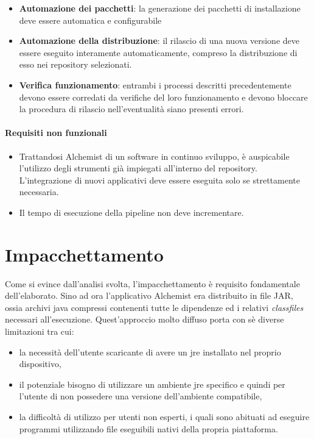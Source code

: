 \begin{itemize}
	\item \textbf{Automazione dei pacchetti}: la generazione dei pacchetti di installazione deve essere automatica e configurabile
	\item \textbf{Automazione della distribuzione}: il rilascio di una nuova versione deve essere eseguito interamente automaticamente, compreso la distribuzione di esso nei repository selezionati.
	\item \textbf{Verifica funzionamento}: entrambi i processi descritti precedentemente devono essere corredati da verifiche del loro funzionamento e devono bloccare la procedura di rilascio nell'eventualità siano presenti errori.
\end{itemize}

\paragraph{Requisiti non funzionali}

\begin{itemize}
	\item Trattandosi Alchemist di un software in continuo sviluppo, è auspicabile l'utilizzo degli strumenti già impiegati all'interno del repository. \\ L'integrazione di nuovi applicativi deve essere eseguita solo se strettamente necessaria.
	\item Il tempo di esecuzione della pipeline non deve incrementare.
\end{itemize}

\section{Impacchettamento}\label{sec:packaging}

Come si evince dall'analisi svolta, l'impacchettamento è requisito fondamentale dell'elaborato. Sino ad ora l'applicativo Alchemist era distribuito in file JAR, ossia archivi java compressi contenenti tutte le dipendenze ed i relativi \textit{classfiles} necessari all'esecuzione. Quest'approccio molto diffuso porta con sè diverse limitazioni tra cui:
\begin{itemize}
	\item la necessità dell'utente scaricante di avere un \ac{jre} installato nel proprio dispositivo,
	\item il potenziale bisogno di utilizzare un ambiente \ac{jre} specifico e quindi per l'utente di non possedere una versione dell'ambiente compatibile,
	\item la difficoltà di utilizzo per utenti non esperti, i quali sono abituati ad eseguire programmi utilizzando file eseguibili nativi della propria piattaforma.
\end{itemize}


